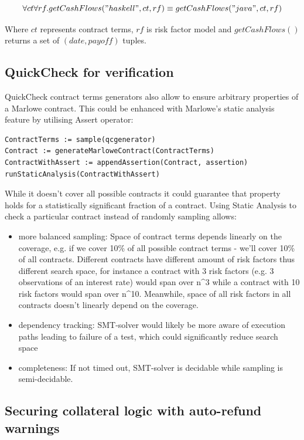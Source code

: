 \documentclass[runningheads]{llncs}
\begin{document}
\smallskip
\noindent 
\begin{equation}
\forall ct\forall rf.getCashFlows("haskell",ct,rf)\equiv getCashFlows("java",ct,rf)
\end{equation}

Where $ct$ represents contract terms, $rf$ is risk factor model and
$getCashFlows()$ returns a set of $(date,payoff)$ tuples.

\subsection{QuickCheck for verification}

QuickCheck\cite{qc} contract terms generators also allow to ensure
arbitrary properties of a Marlowe contract. This could be enhanced
with Marlowe's static analysis feature by utilising Assert operator:

\begin{verbatim}
ContractTerms := sample(qcgenerator) 
Contract := generateMarloweContract(ContractTerms) 
ContractWithAssert := appendAssertion(Contract, assertion) 
runStaticAnalysis(ContractWithAssert)
\end{verbatim}

While it doesn't cover all possible contracts it could guarantee that
property holds for a statistically significant fraction of a contract.
Using Static Analysis to check a particular contract instead of randomly
sampling allows: 
\begin{itemize}
\item more balanced sampling: Space of contract terms depends linearly on
the coverage, e.g. if we cover 10\% of all possible contract terms
- we'll cover 10\% of all contracts. Different contracts have different
amount of risk factors thus different search space, for instance a
contract with 3 risk factors (e.g. 3 observations of an interest rate)
would span over n\textasciicircum 3 while a contract with 10 risk
factors would span over n\textasciicircum 10. Meanwhile, space of
all risk factors in all contracts doesn't linearly depend on the coverage. 
\item dependency tracking: SMT-solver would likely be more aware of execution
paths leading to failure of a test, which could significantly reduce
search space 
\item completeness: If not timed out, SMT-solver is decidable while sampling
is semi-decidable. 
\end{itemize}

\subsection{Securing collateral logic with auto-refund warnings}
\end{document}
